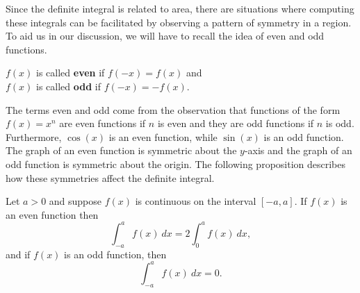 \documentclass[handout]{ximera}
\begin{document}
Since the definite integral is related to area, there are situations where 
computing these integrals can be facilitated by observing a pattern of symmetry 
in a region. To aid us in our discussion, we will have to recall the idea of 
even and odd functions.

\begin{definition}
$f(x)$ is called \textbf{even} if $f(-x) = f(x)$ and\\
$f(x)$ is called \textbf{odd} if $f(-x) = -f(x)$.
\end{definition}
The terms even and odd come from the observation that
functions of the form $f(x) = x^n$ are even functions if $n$ is even and they are
odd functions if $n$ is odd. Furthermore, $\cos(x)$ is an even function, while $\sin(x)$ is an odd function.
The graph of an 
even function is symmetric about the $y$-axis and the graph of an odd function is symmetric about the origin.
The following proposition describes how these symmetries affect the definite integral.

\begin{proposition}
Let $a>0$ and suppose $f(x)$ is continuous on the interval $[-a, a]$.
If $f(x)$ is an even function then
\[\int_{-a}^a f(x) \ dx = 2 \int_0^a f(x) \ dx,\]
and if $f(x)$ is an odd function, then 
\[\int_{-a}^a f(x) \ dx = 0.\]
\end{proposition}  

%

\begin{image}
\end{image}
\end{document}
